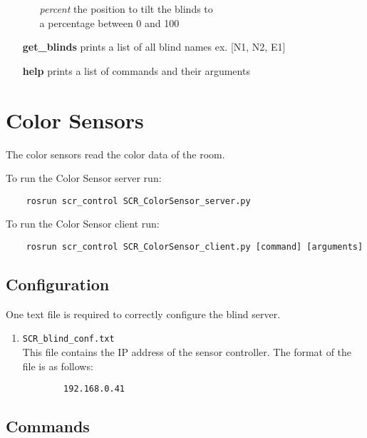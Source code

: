\documentclass[twoside]{article}
\begin{document}
\begin{enumerate}
		\begin{enumerate}[leftmargin=3\parindent]
			\item[\it percent] the position to tilt the blinds to\\
			a percentage between 0 and 100
		\end{enumerate}
		
		\item[\bf get\_blinds] prints a list of all blind names ex. [N1, N2, E1]
		
		\item[\bf help] prints a list of commands and their arguments
		\end{enumerate}
	
	\section{Color Sensors}
	The color sensors read the color data of the room.
	
	To run the Color Sensor server run:
	\begin{verbatim}
	rosrun scr_control SCR_ColorSensor_server.py
	\end{verbatim}
	
	To run the Color Sensor client run:
	\begin{verbatim}
	rosrun scr_control SCR_ColorSensor_client.py [command] [arguments]
	\end{verbatim}
	
	\subsection{Configuration}
	One text file is required to correctly configure the blind server.
	
	\begin{enumerate}
		\item \verb|SCR_blind_conf.txt|\\
		This file contains the IP address of the sensor controller. The format of the file is as follows:
		
		\begin{verbatim}
		192.168.0.41
		\end{verbatim}
	
	\end{enumerate}
	
	\subsection{Commands}
	
\end{document}
